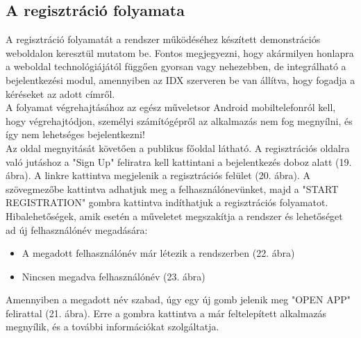 \subsection{A regisztráció folyamata}
A regisztráció folyamatát a rendszer működéséhez készített demonstrációs weboldalon keresztül mutatom be. Fontos megjegyezni, hogy akármilyen honlapra a weboldal technológiájától függően gyorsan vagy nehezebben, de integrálható a bejelentkezési modul, amennyiben az IDX szerveren be van állítva, hogy fogadja a kéréseket az adott címről.
\\A folyamat végrehajtásához az egész műveletsor Android mobiltelefonról kell, hogy végrehajtódjon, személyi számítógépről az alkalmazás nem fog megnyílni, és így nem lehetséges bejelentkezni!
\\Az oldal megnyitását követően a publikus főoldal látható. A regisztrációs oldalra való jutáshoz a "Sign Up" feliratra kell kattintani a bejelentkezés doboz alatt (19. ábra). A linkre kattintva megjelenik a regisztrációs felület (20. ábra). A szövegmezőbe kattintva adhatjuk meg a felhasználónevünket, majd a "START REGISTRATION" gombra kattintva indíthatjuk a regisztrációs folyamatot. Hibalehetőségek, amik esetén a műveletet megszakítja a rendszer és lehetőséget ad új felhasználónév megadására:
\begin{itemize}
\item A megadott felhasználónév már létezik a rendszerben (22. ábra)
\item Nincsen megadva felhasználónév (23. ábra)
\end{itemize}

Amennyiben a megadott név szabad, úgy egy új gomb jelenik meg "OPEN APP" felirattal (21. ábra). 
Erre a gombra kattintva a már feltelepített alkalmazás megnyílik, és a további információkat szolgáltatja.

